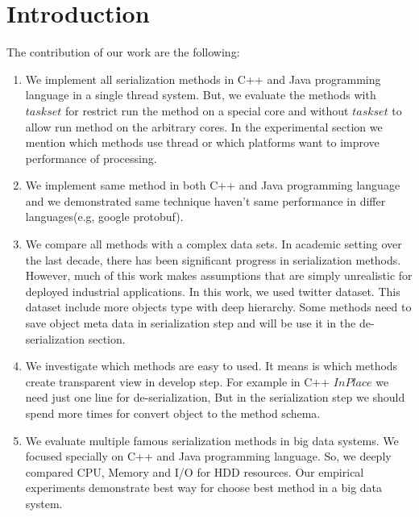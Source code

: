 \section{Introduction}
The contribution of our work are the following:
\begin{enumerate}
	\item We implement all serialization methods in C++ and Java programming language in a single thread system. But, we evaluate the methods with $task set$ for restrict run the method on a special core and without $task set$ to allow run method on the arbitrary cores. In the experimental section we mention which methods use thread or which platforms want to improve performance of processing.
	
	\item We implement same method in both C++ and Java programming language and we demonstrated same technique haven't same performance in differ languages(e.g, google protobuf).
	
	\item We compare all methods with a complex data sets. In academic setting over the last decade, there has been significant progress in serialization methods. However, much of this work makes assumptions that are simply unrealistic for deployed industrial applications. In this work, we used twitter dataset. This dataset include more objects type with deep hierarchy. Some methods need to save object meta data in serialization step and will be use it in the de-serialization section.    
	
	\item We investigate which methods are easy to used. It means is which methods create transparent view in develop step. For example in C++ $InPlace$ we need just one line for de-serialization, But in the serialization step we should spend more times for convert object to the method schema.
	
		
	\item We evaluate multiple famous serialization methods in big data systems. We focused specially on C++ and Java programming language. So, we deeply compared CPU, Memory and I/O for HDD resources. Our empirical experiments demonstrate best way for choose best method in a big data system.
	
	
\end{enumerate}